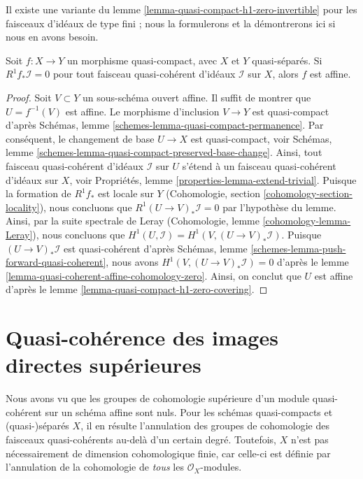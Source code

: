 \noindent
Il existe une variante du lemme \ref{lemma-quasi-compact-h1-zero-invertible}
pour les faisceaux d'idéaux de type fini ; nous la formulerons et la démontrerons ici
si nous en avons besoin.

\begin{lemma}
\label{lemma-criterion-affine-morphism}
Soit $f : X \to Y$ un morphisme quasi-compact, avec $X$ et $Y$ quasi-séparés.
Si $R^1f_*\mathcal{I} = 0$ pour tout faisceau quasi-cohérent d'idéaux
$\mathcal{I}$ sur $X$, alors $f$ est affine.
\end{lemma}

\begin{proof}
Soit $V \subset Y$ un sous-schéma ouvert affine. Il suffit de montrer que
$U = f^{-1}(V)$ est affine. Le morphisme d'inclusion $V \to Y$ est quasi-compact
d'après Schémas, lemme \ref{schemes-lemma-quasi-compact-permanence}.
Par conséquent, le changement de base $U \to X$ est quasi-compact, voir
Schémas, lemme \ref{schemes-lemma-quasi-compact-preserved-base-change}.
Ainsi, tout faisceau quasi-cohérent d'idéaux $\mathcal{I}$ sur $U$
s'étend à un faisceau quasi-cohérent d'idéaux sur $X$, voir
Propriétés, lemme \ref{properties-lemma-extend-trivial}.
Puisque la formation de $R^1f_*$ est locale sur $Y$
(Cohomologie, section \ref{cohomology-section-locality}),
nous concluons que $R^1(U \to V)_*\mathcal{I} = 0$ par l'hypothèse du
lemme. Ainsi, par la suite spectrale de Leray
(Cohomologie, lemme \ref{cohomology-lemma-Leray}),
nous concluons que $H^1(U, \mathcal{I}) = H^1(V, (U \to V)_*\mathcal{I})$.
Puisque $(U \to V)_*\mathcal{I}$ est quasi-cohérent d'après
Schémas, lemme \ref{schemes-lemma-push-forward-quasi-coherent}, nous avons
$H^1(V, (U \to V)_*\mathcal{I}) = 0$ d'après le
lemme \ref{lemma-quasi-coherent-affine-cohomology-zero}.
Ainsi, on conclut que $U$ est affine d'après le
lemme \ref{lemma-quasi-compact-h1-zero-covering}.
\end{proof}















\section{Quasi-cohérence des images directes supérieures}
\label{section-quasi-coherence}

\noindent
Nous avons vu que les groupes de cohomologie supérieure d'un module quasi-cohérent sur un schéma
affine sont nuls. Pour les schémas quasi-compacts et (quasi-)séparés $X$, il
en résulte l'annulation des groupes de cohomologie des
faisceaux quasi-cohérents au-delà d'un certain degré. Toutefois, $X$ n'est pas nécessairement
de dimension cohomologique finie, car celle-ci est définie par l'annulation de la cohomologie
de {\it tous} les $\mathcal{O}_X$-modules.

